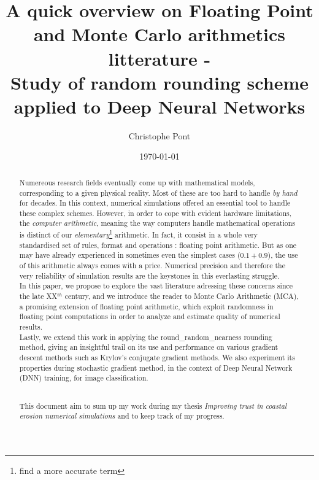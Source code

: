 \documentclass[a4paper,11pt]{article}
\let\cite=\supercite
\begin{document}
\title{A quick overview on Floating Point and Monte Carlo arithmetics litterature -\\
Study of random rounding scheme applied to Deep Neural Networks}
\author{Christophe Pont}
\date{\today{}} %

\maketitle{} %

\begin{abstract}
Numereous research fields eventually come up with mathematical models, corresponding to a given physical reality. Most of these are too hard to handle \emph{by hand} for decades. In this context, numerical simulations offered an essential tool to handle these complex schemes. However, in order to cope with evident hardware limitations, the \emph{computer arithmetic}, meaning the way computers handle mathematical operations is distinct of our \emph{elementary}\footnote{find a more accurate term} arithmetic. In fact, it consist in a whole very standardised set of rules, format and operations : floating point arithmetic. But as one may have already experienced in sometimes even the simplest cases ($0.1+0.9$), the use of this arithmetic always comes with a price. Numerical precision and therefore the very reliability of simulation results are the keystones in this everlasting struggle.\\
In this paper, we propose to explore the vast literature adressing these concerns since the late 
XX$^{th}$ century, 
and we introduce the reader to Monte Carlo Arithmetic (MCA)\cite{parker1997monte}, 
a promising extension of floating point arithmetic, which exploit randomness in floating point computations in order to analyze and estimate quality of numerical results.\\
Lastly, we extend this work in applying the {\ttfamily round\_random\_nearness} rounding method,
 giving an insightful trail on its use and performance on various gradient descent methods such as Krylov's conjugate gradient methods. 
We also experiment its properties during stochastic gradient method, in the context of Deep Neural Network (DNN) training, for image classification.\\
\\
\begin{center}
This document aim to sum up my work during my thesis \emph{Improving trust in coastal erosion numerical simulations} and to keep track of my progress.
\end{center}
\end{abstract}
\end{document}
